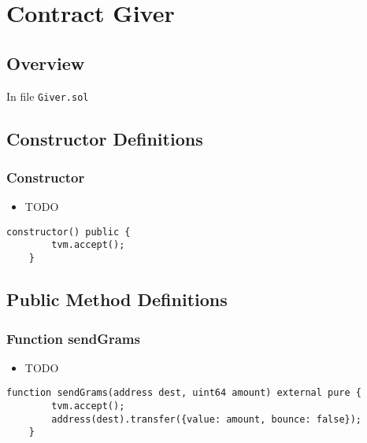 
\chapter{Contract Giver}

\minitoc

\section{Overview}


In file {\tt Giver.sol}

\section{Constructor Definitions}


\subsection{Constructor}

\noindent\begin{itemize}
\item TODO
\end{itemize}

\begin{lstlisting}[firstnumber=6]
    constructor() public {
        tvm.accept();
    }
\end{lstlisting}

\section{Public Method Definitions}


\subsection{Function sendGrams}

\noindent\begin{itemize}
\item TODO
\end{itemize}

\begin{lstlisting}[firstnumber=10]
    function sendGrams(address dest, uint64 amount) external pure {
        tvm.accept();
        address(dest).transfer({value: amount, bounce: false});
    }
\end{lstlisting}
